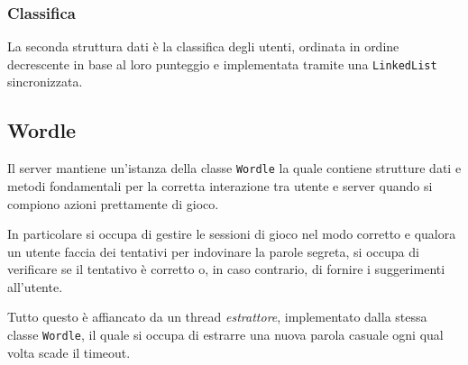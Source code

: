 \subsubsection{Classifica}
La seconda struttura dati è la classifica degli utenti, ordinata in ordine decrescente in base al
loro punteggio e implementata tramite una \verb|LinkedList| sincronizzata.

\subsection{Wordle}
Il server mantiene un'istanza della classe \verb|Wordle| la quale contiene strutture dati e metodi
fondamentali per la corretta interazione tra utente e server quando si compiono azioni prettamente
di gioco.

In particolare si occupa di gestire le sessioni di gioco nel modo corretto e qualora un utente
faccia dei tentativi per indovinare la parole segreta, si occupa di verificare se il tentativo è
corretto o, in caso contrario, di fornire i suggerimenti all'utente.

Tutto questo è affiancato da un thread \emph{estrattore}, implementato dalla stessa classe
\verb|Wordle|, il quale si occupa di estrarre una nuova parola casuale ogni qual volta scade il
timeout.

